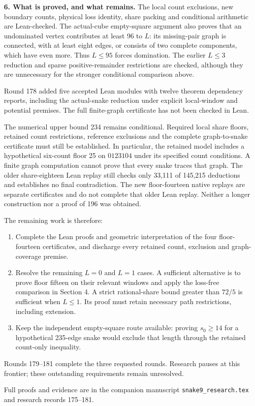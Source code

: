 \documentclass[11pt,a4paper]{article}
\begin{document}
\textbf{6. What is proved, and what remains.}
The local count exclusions, new boundary counts, physical loss identity,
share packing and conditional arithmetic are Lean-checked. The actual-cube
empty-square argument also proves that an undominated vertex contributes
at least 96 to $L$: its missing-pair graph is connected, with at least
eight edges, or consists of two complete components, which have even more.
Thus $L\le95$ forces domination. The earlier $L\le3$ reduction and sparse
positive-remainder restrictions are checked, although they are unnecessary
for the stronger conditional comparison above.

Round 178 added five accepted Lean modules with twelve theorem dependency
reports, including the actual-snake reduction under explicit local-window
and potential premises. The full finite-graph certificate has not been
checked in Lean.

The numerical upper bound 234 remains conditional. Required local share
floors, retained count restrictions, reference exclusions and the complete
graph-to-snake certificate must still be established. In particular, the
retained model includes a hypothetical six-count floor 25 on $0123104$
under its specified count conditions. A finite graph computation cannot
prove that every snake traces that graph. The older share-eighteen Lean replay
still checks only 33,111 of 145,215 deductions and establishes no final
contradiction. The new floor-fourteen native replays are separate
certificates and do not complete that older Lean replay. Neither a longer construction nor a proof of 196 was obtained.

The remaining work is therefore:
\begin{enumerate}
\item Complete the Lean proofs and geometric interpretation of the
four floor-fourteen certificates, and discharge every retained count,
exclusion and graph-coverage premise.
\item Resolve the remaining $L=0$ and $L=1$ cases. A sufficient alternative
is to prove floor fifteen on their relevant windows and apply the
loss-free comparison in Section 4. A strict rational-share bound
greater than $72/5$ is sufficient when $L\le1$. Its proof must
retain necessary path restrictions, including extension.
\item Keep the independent empty-square route available: proving
$s_0\ge14$ for a hypothetical 235-edge snake would exclude that length
through the retained count-only inequality.
\end{enumerate}
Rounds 179--181 complete the three requested rounds. Research pauses
at this frontier; these outstanding requirements remain unresolved.

\smallskip
{\small Full proofs and evidence are in the companion manuscript
\texttt{snake9\_research.tex} and research records 175--181.}
\end{document}
